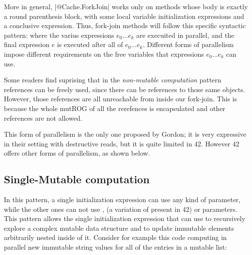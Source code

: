 More in general, \Q|$@$Cache.ForkJoin| works only on methods whose body is exactly a round parenthesis block, with some local variable initialization expressions and a conclusive expression.
Thus, fork-join methods will follow this specific syntactic pattern:
where the varius expressions $e_0...e_k$ are execuited in parallel, and the final expression $e$ is executed after all of $e_0...e_k$.
Different forms of parallelism impose different requirements on the free variables that expressions $e_0...e_k$ can use.

Some readers find suprising that in the \emph{non-mutable computation} pattern \Q@read@ references can be freely used, since there can be \Q@mut@ references to those same objects.
However, those \Q@mut@ references are all unreachable from inside our fork-join. This is because the whole
mutROG of all the \Q@capsule@ rerefences is encapsulated and other \Q@mut@ references are not allowed.

This form of parallelism is the only one proposed by Gordon; it is very expressive in their setting with destructive reads, but it is quite limited in 42. However 42 offers other forms of parallelism, as shown below.



\subsection*{Single-Mutable computation}
In this pattern, a single initialization expression can use any kind of parameter, while the other ones can not 
use \Q@mut@, \Q@lent@ (a variation of \Q@mut@ present in 42) or \Q@read@ parameters.
This pattern allows the single initialization expression that can use \Q@mut@ to recursively explore a complex mutable data structure and to update immutable elements arbitrarily nested inside of it.
Consider for example this code computing in parallel 
new immutable string values for all of
the entries in a mutable list:

